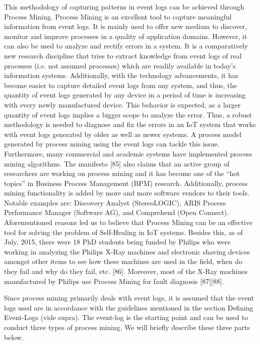 This methodology of capturing patterns in event logs can be achieved through Process Mining. Process Mining is an excellent tool to capture meaningful information from event logs. It is mainly used to offer new medium to discover, monitor and improve processes in a quality of application domains. However, it can also be used to analyze and rectify errors in a system. It is a comparatively new research discipline that tries to extract knowledge from event logs of real processes (i.e. not assumed processes) which are readily available in today’s information systems. Additionally, with the technology advancements, it has become easier to capture detailed event logs from any system, and thus, the quantity of event logs generated by any device in a period of time is increasing with every newly manufactured device. This behavior is expected, as a larger quantity of event logs implies a bigger scope to analyze the error. Thus, a robust methodology is needed to diagnose and fix the errors in an IoT system that works with event logs generated by older as well as newer systems. A process model generated by process mining using the event logs can tackle this issue. Furthermore, many commercial and academic systems have implemented process mining algorithms. The manifesto [85] also claims that an active group of researchers are working on process mining and it has become one of the “hot topics” in Business Process Management (BPM) research. Additionally, process mining functionality is added by more and more software vendors to their tools. Notable examples are: Discovery Analyst (StereoLOGIC), ARIS Process Performance Manager (Software AG), and Comprehend (Open Connect). Aforementioned reasons led us to believe that Process Mining can be an effective tool for solving the problem of Self-Healing in IoT systems. Besides this, as of July, 2015, there were 18 PhD students being funded by Philips who were working in analyzing the Philips X-Ray machines and electronic shaving devices amongst other items to see how these machines are used in the field, when do they fail and why do they fail, etc. [86]. Moreover, most of the X-Ray machines manufactured by Philips use Process Mining for fault diagnosis [87][88].

Since process mining primarily deals with event logs, it is assumed that the event logs used are in accordance with the guidelines mentioned in the section Defining Event-Logs (vide supra). The event-log is the starting point and can be used to conduct three types of process mining. We will briefly describe these three parts below.

